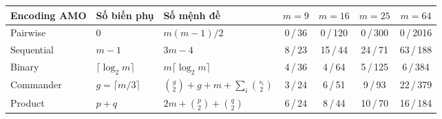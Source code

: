 \begin{tabular}{lllcccc}
\toprule
Encoding AMO & Số biến phụ & Số mệnh đề & $m=9$ & $m=16$ & $m=25$ & $m=64$ \\
\midrule
Pairwise & $0$ & $m(m-1)/2$ & 0\,/\,36 & 0\,/\,120 & 0\,/\,300 & 0\,/\,2016 \\
Sequential & $m-1$ & $3m-4$ & 8\,/\,23 & 15\,/\,44 & 24\,/\,71 & 63\,/\,188 \\
Binary & $\lceil\log_2 m\rceil$ & $m\lceil\log_2 m\rceil$ & 4\,/\,36 & 4\,/\,64 & 5\,/\,125 & 6\,/\,384 \\
Commander & $g=\lceil m/3\rceil$ & $\binom{g}{2}+g+m+\sum_i\binom{s_i}{2}$ & 3\,/\,24 & 6\,/\,51 & 9\,/\,93 & 22\,/\,379 \\
Product & $p+q$ & $2m+\binom{p}{2}+\binom{q}{2}$ & 6\,/\,24 & 8\,/\,44 & 10\,/\,70 & 16\,/\,184 \\
\bottomrule
\end{tabular}
